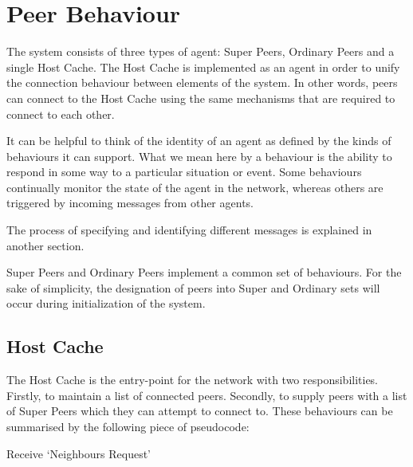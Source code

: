 \section{Peer Behaviour}

The system consists of three types of agent: Super Peers, Ordinary Peers and a
single Host Cache.  The Host Cache is implemented as an agent in order to unify
the connection behaviour between elements of the system.  In other words, peers
can connect to the Host Cache using the same mechanisms that are required to
connect to each other.

It can be helpful to think of the identity of an agent as defined by the kinds
of behaviours it can support. What we mean here by a behaviour is the ability to
respond in some way to a particular situation or event.  Some behaviours
continually monitor the state of the agent in the network, whereas others
are triggered by incoming messages from other agents.

The process of specifying and identifying different messages is explained in
another section.

Super Peers and Ordinary Peers implement a common set of behaviours. For
the sake of simplicity, the designation of peers into Super and Ordinary sets
will occur during initialization of the system.

\subsection{Host Cache}

The Host Cache is the entry-point for the network with two responsibilities.
Firstly, to maintain a list of connected peers. Secondly, to supply peers with a
list of Super Peers which they can attempt to connect to. These behaviours can
be summarised by the following piece of pseudocode:

\begin{algorithm}[H]
\caption{Receive `Neighbours Request'}
\end{algorithm}

